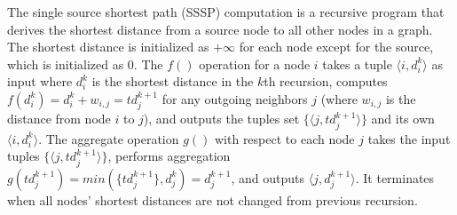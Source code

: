  The single source shortest path (SSSP) computation is a recursive program that derives the shortest distance from a source node to all other nodes in a graph. The shortest distance is initialized as $+\infty$ for each node except for the source, which is initialized as 0. The $f()$ operation for a node $i$ takes a tuple $\langle i,d_i^k\rangle$ as input where $d_i^k$ is the shortest distance in the $k$th recursion, computes $f(d_i^k)=d_i^k+w_{i,j}=td_j^{k+1}$ for any outgoing neighbors $j$ (where $w_{i,j}$ is the distance from node $i$ to $j$), and outputs the tuples set $\{\langle j,td_j^{k+1}\rangle\}$ and its own $\langle i,d_i^k\rangle$. The aggregate operation $g()$ with respect to each node $j$ takes the input tuples $\{\langle j,td_j^{k+1}\rangle\}$, performs aggregation $g(td_j^{k+1})=min(\{td_j^{k+1}\},d_j^k)=d_j^{k+1}$, and outputs $\langle j,d_j^{k+1}\rangle$. It terminates when all nodes' shortest distances are not changed from previous recursion.
